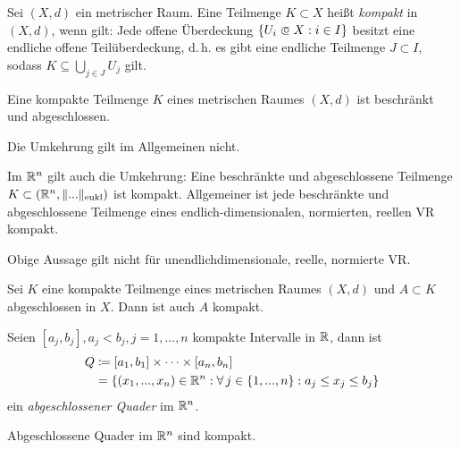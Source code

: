 \documentclass{cheat-sheet}
\begin{document}
\begin{defn}
Sei $(X, d)$ ein metrischer Raum. Eine Teilmenge $K \subset X$ heißt \emph{kompakt} in $(X, d)$, wenn gilt: Jede offene Überdeckung $\{ U_i \opn X : i \in I \}$ besitzt eine endliche offene Teilüberdeckung, d.\,h. es gibt eine endliche Teilmenge $J \subset I$, sodass $K \subseteq \bigcup_{j \in J} U_j$ gilt.
\end{defn}


\begin{satz}
Eine kompakte Teilmenge $K$ eines metrischen Raumes $(X, d)$ ist beschränkt und abgeschlossen.
\end{satz}

\begin{acht}
Die Umkehrung gilt im Allgemeinen nicht.
\end{acht}

\begin{satz}
Im $\mathbb{R}^n$ gilt auch die Umkehrung: Eine beschränkte und abgeschlossene Teilmenge $K \subset (\mathbb{R}^n, \| ... \|_\text{eukl})$ ist kompakt. Allgemeiner ist jede beschränkte und abgeschlossene Teilmenge eines endlich-dimensionalen, normierten, reellen VR kompakt.
\end{satz}

\begin{acht}
Obige Aussage gilt nicht für unendlichdimensionale, reelle, normierte VR.
\end{acht}


\begin{satz}
Sei $K$ eine kompakte Teilmenge eines metrischen Raumes $(X, d)$ und $A \subset K$ abgeschlossen in $X$. Dann ist auch $A$ kompakt.
\end{satz}

\begin{defn}
Seien $[a_j, b_j], a_j < b_j, j = 1, ..., n$ kompakte Intervalle in $\mathbb{R}$, dann ist
\begin{align*}
  Q &\coloneqq [a_1, b_1] \times \cdots \times [a_n, b_n]\\
  &= \left\{ (x_1, ..., x_n) \in \mathbb{R}^n : \forall\,j \in \{ 1, ..., n \} : a_j \le x_j \le b_j \right\}
\end{align*}
ein \emph{abgeschlossener Quader} im $\mathbb{R}^n$.
\end{defn}

\begin{satz}
Abgeschlossene Quader im $\mathbb{R}^n$ sind kompakt.
\end{satz}
\end{document}
